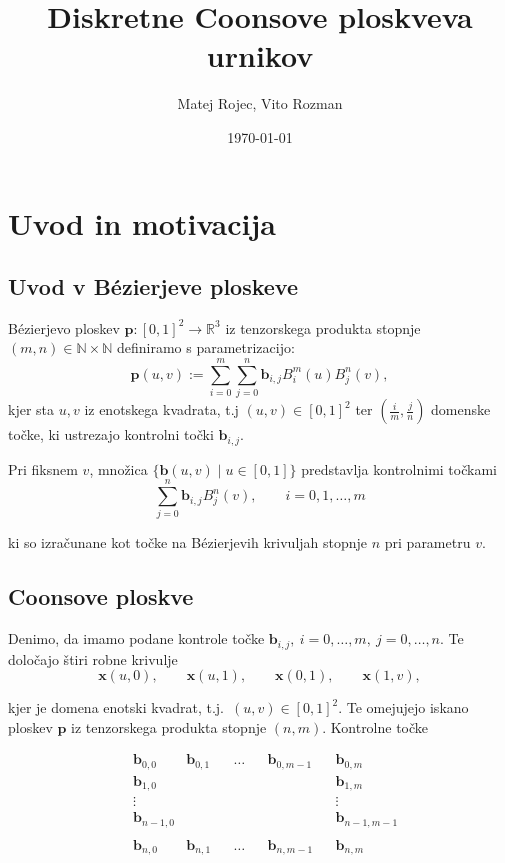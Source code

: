 \documentclass[a4paper,12pt]{article}
\begin{document}
\newcommand{\N}{\mathbb{N}}
\newcommand{\R}{\mathbb{R}}


\title{Diskretne Coonsove ploskveva urnikov}
\author{Matej Rojec, Vito Rozman}
\date{\today}

\maketitle

\tableofcontents

\section{Uvod in motivacija}

\subsection{Uvod v Bézierjeve ploskeve}
Bézierjevo ploskev $\mathbf{p} : [0,1]^2 \rightarrow \R^3$ iz tenzorskega produkta stopnje $(m, n) \in \N \times \N$  
definiramo s parametrizacijo:
$$\mathbf{p}(u,v) := \sum_{i=0}^m \sum_{j=0}^n \mathbf{b}_{i,j} B_i^m(u)B_j^n(v),$$
kjer sta $u,v$ iz enotskega kvadrata, t.j $(u,v) \in [0,1]^2$ ter $(\frac{i}{m}, \frac{j}{n})$
domenske točke, ki ustrezajo kontrolni točki $\mathbf{b}_{i,j}$.

Pri fiksnem $v$, množica $\{\mathbf{b} (u,v) \mid u \in [0,1]  \}$ predstavlja 
kontrolnimi točkami    $$\sum_{j=0}^n \mathbf{b}_{i,j} B_j^n(v), \qquad i=0,1,\ldots,m$$

ki so izračunane kot točke na Bézierjevih krivuljah stopnje $n$ pri parametru $v$.


\subsection{Coonsove ploskve}

Denimo, da imamo podane kontrole točke $\mathbf{b}_{i,j},~ i=0,\ldots,m,~ j=0,\ldots,n$.
Te določajo štiri robne krivulje 
$$\mathbf{x}(u,0),\qquad \mathbf{x}(u,1),\qquad \mathbf{x}(0,1),\qquad \mathbf{x}(1,v),$$

kjer je domena enotski kvadrat, t.j.~$(u,v) \in [0,1]^2$.
Te omejujejo iskano ploskev $\mathbf{p}$ iz tenzorskega produkta stopnje $(n,m)$.
Kontrolne točke

\begin{align*}
      &\mathbf{b}_{0,0} &\mathbf{b}_{0,1} & &\ldots & &\mathbf{b}_{0,m-1} & &\mathbf{b}_{0,m} \\
      &\mathbf{b}_{1,0}  &  & &  & &  & &\mathbf{b}_{1,m} \\
      &\vdots  &  &  & &  & & &\vdots\\
      &\mathbf{b}_{n-1,0}  &  &  & &  & &  &\mathbf{b}_{n-1,m-1} \\ \\
      &\mathbf{b}_{n,0} &\mathbf{b}_{n,1} & &\ldots & &\mathbf{b}_{n,m-1} & &\mathbf{b}_{n,m} \\
\end{align*}
\end{document}
